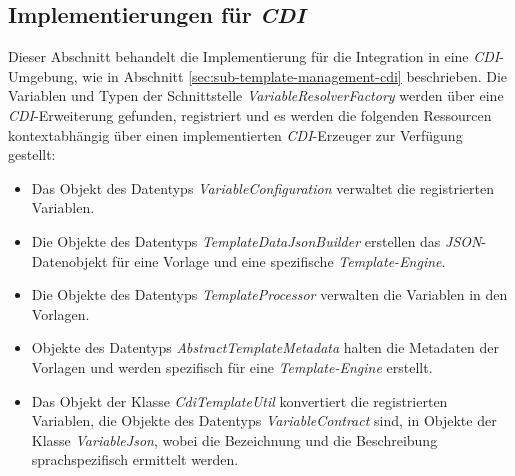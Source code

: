 \subsection{Implementierungen für \emph{CDI}}
\label{sec:sub-impl-integartion-cdi}
Dieser Abschnitt behandelt die Implementierung für die Integration in eine \emph{CDI}-Umgebung, wie in Abschnitt \ref{sec:sub-template-management-cdi} beschrieben. Die Variablen und Typen der Schnittstelle \emph{VariableResolverFactory} werden über eine \emph{CDI}-Erweiterung gefunden,  registriert und es werden die folgenden Ressourcen kontextabhängig über einen implementierten \emph{CDI}-Erzeuger zur Verfügung gestellt: 
\begin{itemize}
 \item Das Objekt des Datentyps \emph{VariableConfiguration} verwaltet die registrierten Variablen.
 \item Die Objekte des Datentyps \emph{TemplateDataJsonBuilder} erstellen das \emph{JSON}-Datenobjekt für eine Vorlage und eine spezifische \emph{Template-Engine}.
 \item Die Objekte des Datentyps \emph{TemplateProcessor} verwalten die Variablen in den Vorlagen.
 \item Objekte des Datentyps \emph{AbstractTemplateMetadata} halten die Metadaten der Vorlagen und werden spezifisch für eine \emph{Template-Engine} erstellt.
 \item Das Objekt der Klasse \emph{CdiTemplateUtil} konvertiert die registrierten Variablen, die Objekte des Datentyps \emph{VariableContract} sind, in Objekte der Klasse \emph{VariableJson}, wobei die Bezeichnung und die Beschreibung sprachspezifisch ermittelt werden.
\end{itemize}

